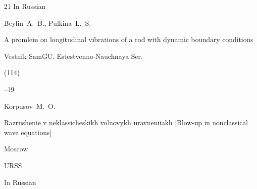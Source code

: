 \begin{thebibliography}{21}
\lang In Russian

\by Beylin~A.~B., Pulkina~L.~S.

\paper A promlem on longitudinal vibrations of a rod with dynamic boundary conditions

\jour Vestnik SamGU. Estestvenno-Nauchnaya Ser.


(114)

--19




\by Korpusov~M.~O.

\book Razrushenie v neklassicheskikh volnovykh uravneniiakh \rm [Blow-up in nonclassical wave equations]

\publaddr Moscow

\publ URSS



\lang In Russian



\end{thebibliography}





\EngDate





\newpage

\Russian



%

%

%

%

%

